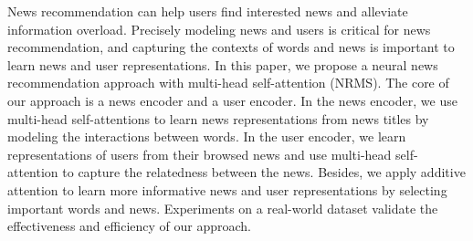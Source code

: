 News recommendation can help users find interested news and alleviate information overload. Precisely modeling news and users is critical for news recommendation, and capturing the contexts of words and news is important to learn news and user representations. In this paper, we propose a neural news recommendation approach with multi-head self-attention (NRMS).
The core of our approach is a news encoder and a user encoder. In the news encoder, we use multi-head self-attentions to learn news representations from news titles by modeling the interactions between words. In the user encoder, we learn representations of users from their browsed news and use multi-head self-attention to capture the relatedness between the news. Besides, we apply additive attention to learn more informative news and user representations by selecting important words and news. Experiments on a real-world dataset validate the effectiveness and efficiency of our approach.